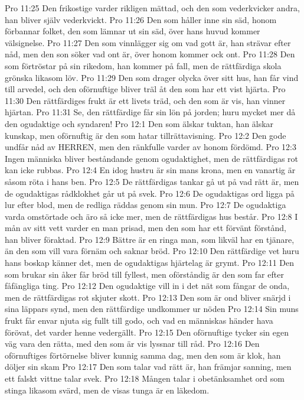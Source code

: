 Pro 11:25  Den frikostige varder rikligen mättad, och den som vederkvicker andra, han bliver själv vederkvickt.
Pro 11:26  Den som håller inne sin säd, honom förbannar folket, den som lämnar ut sin säd, över hans huvud kommer välsignelse.
Pro 11:27  Den som vinnlägger sig om vad gott är, han strävar efter nåd, men den son söker vad ont är, över honom kommer ock ont.
Pro 11:28  Den som förtröstar på sin rikedom, han kommer på fall, men de rättfärdiga skola grönska likasom löv.
Pro 11:29  Den som drager olycka över sitt hus, han får vind till arvedel, och den oförnuftige bliver träl åt den som har ett vist hjärta.
Pro 11:30  Den rättfärdiges frukt är ett livets träd, och den som är vis, han vinner hjärtan.
Pro 11:31  Se, den rättfärdige får sin lön på jorden; huru mycket mer då den ogudaktige och syndaren!
Pro 12:1  Den som älskar tuktan, han älskar kunskap, men oförnuftig är den som hatar tillrättavisning.
Pro 12:2  Den gode undfår nåd av HERREN, men den ränkfulle varder av honom fördömd.
Pro 12:3  Ingen människa bliver beståndande genom ogudaktighet, men de rättfärdigas rot kan icke rubbas.
Pro 12:4  En idog hustru är sin mans krona, men en vanartig är såsom röta i hans ben.
Pro 12:5  De rättfärdigas tankar gå ut på vad rätt är, men de ogudaktigas rådklokhet går ut på svek.
Pro 12:6  De ogudaktigas ord ligga på lur efter blod, men de redliga räddas genom sin mun.
Pro 12:7  De ogudaktiga varda omstörtade och äro så icke mer, men de rättfärdigas hus består.
Pro 12:8  I mån av sitt vett varder en man prisad, men den som har ett förvänt förstånd, han bliver föraktad.
Pro 12:9  Bättre är en ringa man, som likväl har en tjänare, än den som vill vara förnäm och saknar bröd.
Pro 12:10  Den rättfärdige vet huru hans boskap känner det, men de ogudaktigas hjärtelag är grymt.
Pro 12:11  Den som brukar sin åker får bröd till fyllest, men oförståndig är den som far efter fåfängliga ting.
Pro 12:12  Den ogudaktige vill in i det nät som fångar de onda, men de rättfärdigas rot skjuter skott.
Pro 12:13  Den som är ond bliver snärjd i sina läppars synd, men den rättfärdige undkommer ur nöden
Pro 12:14  Sin muns frukt får envar njuta sig fullt till godo, och vad en människas händer hava förövat, det varder henne vedergällt.
Pro 12:15  Den oförnuftige tycker sin egen väg vara den rätta, med den som är vis lyssnar till råd.
Pro 12:16  Den oförnuftiges förtörnelse bliver kunnig samma dag, men den som är klok, han döljer sin skam
Pro 12:17  Den som talar vad rätt är, han främjar sanning, men ett falskt vittne talar svek.
Pro 12:18  Mången talar i obetänksamhet ord som stinga likasom svärd, men de visas tunga är en läkedom.
